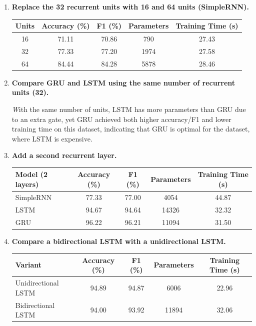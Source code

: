 \documentclass[10pt]{article}
\begin{document}
\begin{enumerate}

\item \textbf{Replace the 32 recurrent units with 16 and 64 units (SimpleRNN).}

\begin{center}
\begin{tabular}{|c|c|c|c|c|}
\hline
Units & Accuracy (\%) & F1 (\%) & Parameters & Training Time (s)\\
\hline
16 & 71.11 & 70.86 & 790  & 27.43\\
32 & 77.33 & 77.20 & 1974 & 27.58\\
64 & 84.44 & 84.28 & 5878 & 28.46\\
\hline
\end{tabular}
\end{center}

\item \textbf{Compare GRU and LSTM using the same number of recurrent units (32).}

\textit With the same number of units, LSTM has more
parameters than GRU due to an extra gate, yet GRU achieved both higher accuracy/F1
and lower training time on this dataset, indicating that GRU is optimal for the dataset, where LSTM is expensive.

\item \textbf{Add a second recurrent layer.}

\begin{center}
\begin{tabular}{|l|c|c|c|c|}
\hline
Model (2 layers) & Accuracy (\%) & F1 (\%) & Parameters & Training Time (s)\\
\hline
SimpleRNN & 77.33 & 77.00 & 4054  & 44.87\\
LSTM      & 94.67 & 94.64 & 14326 & 32.32\\
GRU       & 96.22 & 96.21 & 11094 & 31.50\\
\hline
\end{tabular}
\end{center}

\item \textbf{Compare a bidirectional LSTM with a unidirectional LSTM.}

\begin{center}
\begin{tabular}{|l|c|c|c|c|}
\hline
Variant & Accuracy (\%) & F1 (\%) & Parameters & Training Time (s)\\
\hline
Unidirectional LSTM & 94.89 & 94.87 & 6006  & 22.96\\
Bidirectional LSTM  & 94.00 & 93.92 & 11894 & 32.06\\
\hline
\end{tabular}
\end{center}


\end{enumerate}
\end{document}
